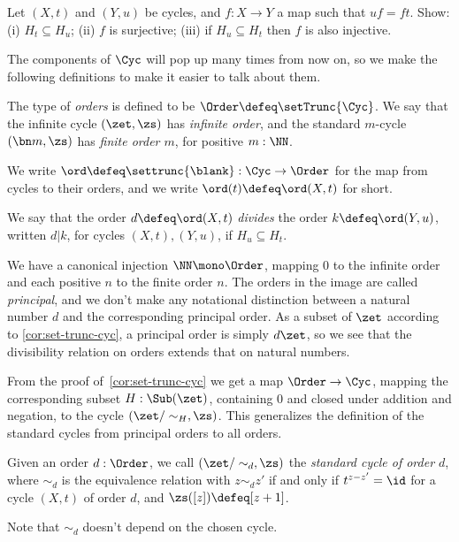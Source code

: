 \begin{xca}\label{xca:map-of-cycles}
Let $(X,t)$ and $(Y,u)$ be cycles, and $f:X\to Y$ a map such that $uf=ft$.
Show: (i) $H_t \subseteq H_u$; (ii) $f$ is surjective; (iii)
if $H_u \subseteq H_t$ then $f$ is also injective.
\end{xca}

The components of $\Cyc$ will pop up many times from now on,
so we make the following definitions to make it easier to talk about them.
\begin{definition}\label{def:Order}
  The type of \emph{orders} is defined to be
  $\Order\defeq\setTrunc{\Cyc}$.
  We say that the infinite cycle $(\zet,\zs)$ has \emph{infinite order},
  and the standard $m$-cycle $(\bn m,\zs)$ has \emph{finite order $m$},
  for positive $m:\NN$.

  We write $\ord\defeq\settrunc{\blank}:\Cyc\to\Order$ for the map
  from cycles to their orders, and we write $\ord(t)\defeq\ord(X,t)$ for short.

  We say that the order $d\defeq\ord(X,t)$ \emph{divides} the
  order $k\defeq\ord(Y,u)$, written $d | k$,
  for cycles $(X,t),(Y,u)$, if $H_u \subseteq H_t$.
\end{definition}
We have a canonical injection $\NN \mono \Order$,
mapping $0$ to the infinite order and each positive $n$ to the finite order $n$.
The orders in the image are called \emph{principal},
and we don't make any notational distinction between a natural number $d$
and the corresponding principal order.
As a subset of $\zet$ according to \cref{cor:set-trunc-cyc},
a principal order is simply $d\zet$,
so we see that the divisibility relation on orders extends
that on natural numbers.

From the proof of~\cref{cor:set-trunc-cyc} we get a map
$\Order \to \Cyc$, mapping the corresponding subset $H:\Sub(\zet)$,
containing $0$ and closed under addition and negation, to the cycle
$(\zet/\sim_H, \zs)$.
This generalizes the definition of the standard
cycles from principal orders to all orders.
\begin{definition}\label{def:standard-cycle}
  Given an order $d:\Order$, we call $(\zet/\sim_d, \zs)$
  the \emph{standard cycle of order $d$}, where $\sim_d$ is the
  equivalence relation with $z \sim_d z'$ if and only if
  $t^{z-z'} = \id$ for a cycle $(X,t)$ of order $d$,
  and $\zs([z]) \defeq [z+1]$.
\end{definition}
Note that $\sim_d$ doesn't depend on the chosen cycle.

